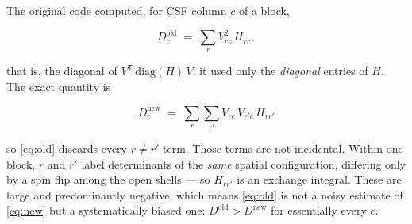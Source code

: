 \documentclass[11pt,a4paper]{article}
\begin{document}
The original code computed, for CSF column $c$ of a block,

\begin{equation}
  D_c^{\text{old}} \;=\; \sum_{r} V_{rc}^{2}\, H_{rr},
  \label{eq:old}
\end{equation}

that is, the diagonal of $V^{\mathsf T}\,\mathrm{diag}(H)\,V$: it used only the
\emph{diagonal} entries of $H$. The exact quantity is

\begin{equation}
  \boxed{\;
  D_c^{\text{new}} \;=\; \sum_{r}\sum_{r'} V_{rc}\,V_{r'c}\, H_{rr'} \;}
  \label{eq:new}
\end{equation}

so \eqref{eq:old} discards every $r \neq r'$ term. Those terms are not
incidental. Within one block, $r$ and $r'$ label determinants of the
\emph{same} spatial configuration, differing only by a spin flip among the
open shells --- so $H_{rr'}$ is an exchange integral. These are large and
predominantly negative, which means \eqref{eq:old} is not a noisy estimate of
\eqref{eq:new} but a systematically biased one: $D^{\text{old}} >
D^{\text{new}}$ for essentially every $c$.
\end{document}
